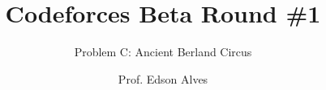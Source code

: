 \title{Codeforces Beta Round \#1}
\subtitle{Problem C: Ancient Berland Circus}
\date{}
\author{Prof. Edson Alves}
